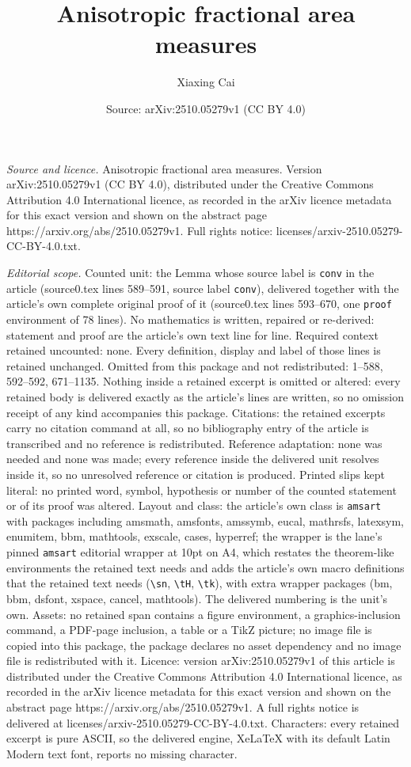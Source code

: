 \documentclass[10pt,a4paper]{amsart}
\title[Anisotropic fractional area measures]{Anisotropic fractional area measures}
\author{Xiaxing Cai}
\date{Source: arXiv:2510.05279v1 (CC BY 4.0)}
\begin{document}
\maketitle

\noindent\emph{Source and licence.} Anisotropic fractional area measures. Version arXiv:2510.05279v1 (CC BY 4.0), distributed under the Creative Commons Attribution 4.0 International licence, as recorded in the arXiv licence metadata for this exact version and shown on the abstract page https://arxiv.org/abs/2510.05279v1. Full rights notice: licenses/arxiv-2510.05279-CC-BY-4.0.txt.\par\smallskip

\noindent\textit{Editorial scope.} Counted unit: the Lemma whose source label is \texttt{conv} in the article (source0.tex lines 589--591, source label \texttt{conv}), delivered together with the article's own complete original proof of it (source0.tex lines 593--670, one \texttt{proof} environment of 78 lines). No mathematics is written, repaired or re-derived: statement and proof are the article's own text line for line. Required context retained uncounted: none. Every definition, display and label of those lines is retained unchanged. Omitted from this package and not redistributed: 1--588, 592--592, 671--1135. Nothing inside a retained excerpt is omitted or altered: every retained body is delivered exactly as the article's lines are written, so no omission receipt of any kind accompanies this package. Citations: the retained excerpts carry no citation command at all, so no bibliography entry of the article is transcribed and no reference is redistributed. Reference adaptation: none was needed and none was made; every reference inside the delivered unit resolves inside it, so no unresolved reference or citation is produced. Printed slips kept literal: no printed word, symbol, hypothesis or number of the counted statement or of its proof was altered. Layout and class: the article's own class is \texttt{amsart} with packages including amsmath, amsfonts, amssymb, eucal, mathrsfs, latexsym, enumitem, bbm, mathtools, exscale, cases, hyperref; the wrapper is the lane's pinned \texttt{amsart} editorial wrapper at 10pt on A4, which restates the theorem-like environments the retained text needs and adds the article's own macro definitions that the retained text needs (\texttt{\textbackslash sn}, \texttt{\textbackslash tH}, \texttt{\textbackslash tk}), with extra wrapper packages (bm, bbm, dsfont, xspace, cancel, mathtools). The delivered numbering is the unit's own. Assets: no retained span contains a figure environment, a graphics-inclusion command, a PDF-page inclusion, a table or a TikZ picture; no image file is copied into this package, the package declares no asset dependency and no image file is redistributed with it. Licence: version arXiv:2510.05279v1 of this article is distributed under the Creative Commons Attribution 4.0 International licence, as recorded in the arXiv licence metadata for this exact version and shown on the abstract page https://arxiv.org/abs/2510.05279v1. A full rights notice is delivered at licenses/arxiv-2510.05279-CC-BY-4.0.txt. Characters: every retained excerpt is pure ASCII, so the delivered engine, XeLaTeX with its default Latin Modern text font, reports no missing character.
\end{document}
